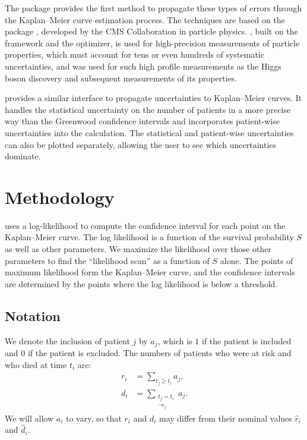 \documentclass[article]{jss}
\newcommand{\KM}{Kaplan--Meier} %
\begin{document}
The  package provides the first method to propagate these types of errors through the \KM{} curve estimation process.  The techniques are based on the  package \citep{CAT-23-001}, developed by the CMS Collaboration in particle physics\@.  , built on the  framework \citep{RooFit} and the  optimizer, is used for high-precision measurements of particle properties, which must account for tens or even hundreds of systematic uncertainties, and was used for such high profile measurements as the Higgs boson discovery \citep{HIG-12-028} and subsequent measurements of its properties.

 provides a similar interface to propagate uncertainties to \KM{} curves.  It handles the statistical uncertainty on the number of patients in a more precise way than the Greenwood confidence intervals and incorporates patient-wise uncertainties into the calculation.  The statistical and patient-wise uncertainties can also be plotted separately, allowing the user to see which uncertainties dominate.

\section{Methodology}\label{sec:methodology}

 uses a log-likelihood to compute the confidence interval for each point on the \KM{} curve.  The log likelihood is a function of the survival probability \(S\) as well as other parameters.  We maximize the likelihood over those other parameters to find the ``likelihood scan'' as a function of \(S\) alone.  The points of maximum likelihood form the \KM{} curve, and the confidence intervals are determined by the points where the log likelihood is below a threshold.

\subsection{Notation}\label{sec:notation}

We denote the inclusion of patient \(j\) by \(a_j\), which is \(1\) if the patient is included and \(0\) if the patient is excluded.  The numbers of patients who were at risk and who died at time \(t_i\) are:
\begin{align}
r_i &= \sum_{t_j \geq t_i} a_j, \\
d_i &= \sum_{\substack{t_j = t_i \\ \neg c_j}} a_j.
\end{align}
We will allow \(a_i\) to vary, so that \(r_i\) and \(d_i\) may differ from their nominal values \(\hat{r}_i\) and \(\hat{d}_i\).
\end{document}

